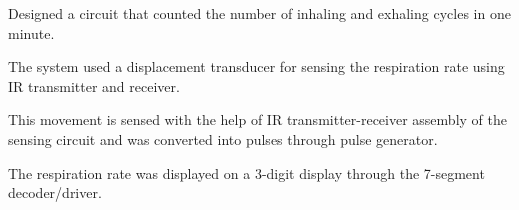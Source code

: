 \documentclass[letterpaper]{deedy-resume} %
\begin{document}
\begin{minipage}[t]{0.76\textwidth}
\sectionspace %

\begin{tightitemize}
\item Designed a circuit that counted the number of inhaling and exhaling cycles in one minute.
\item The system used a displacement transducer for sensing the respiration rate using IR transmitter and receiver.
\item This movement is sensed with the help of IR transmitter-receiver assembly of the sensing circuit and was converted into pulses through pulse generator. 
\item The respiration rate was displayed on a 3-digit display through the 7-segment decoder/driver.
\end{tightitemize}
\end{minipage} %
\end{document}
